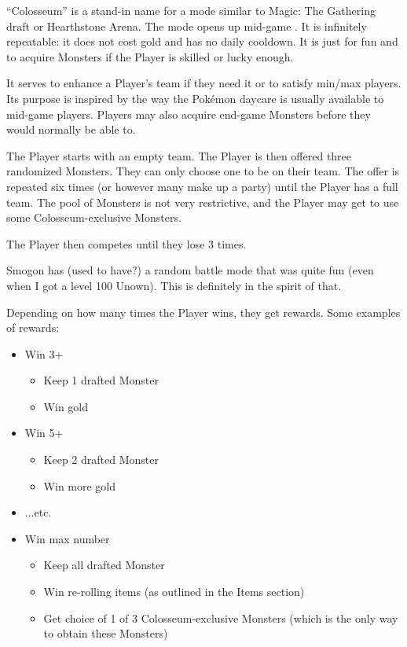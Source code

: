 ``Colosseum'' is a stand-in name for a mode similar to Magic: The Gathering draft or Hearthstone Arena. The mode opens up mid-game . It is infinitely repeatable: it does not cost gold and has no daily cooldown. It is just for fun and to acquire Monsters if the Player is skilled or lucky enough.

It serves to enhance a Player's team if they need it or to satisfy min/max players. Its purpose is inspired by the way the Pok\'{e}mon daycare is usually available to mid-game players. Players may also acquire end-game Monsters before they would normally be able to.

The Player starts with an empty team. The Player is then offered three randomized Monsters. They can only choose one to be on their team. The offer is repeated six times (or however many make up a party) until the Player has a full team. The pool of Monsters is not very restrictive, and the Player may get to use some Colosseum-exclusive Monsters.

The Player then competes until they lose 3  times.

Smogon has (used to have?) a random battle mode that was quite fun (even when I got a level 100 Unown). This is definitely in the spirit of that.

Depending on how many times the Player wins, they get rewards. Some examples of rewards:
\begin{itemize}
	\item{Win 3+
		\begin{itemize}
			\item{Keep 1 drafted Monster}
			\item{Win gold}
		\end{itemize}
	}
	\item{Win 5+
		\begin{itemize}
			\item{Keep 2 drafted Monster}
			\item{Win more gold}
		\end{itemize}
	}
	\item{...etc.}
	\item{Win max number 
		\begin{itemize}
			\item{Keep all drafted Monster}
			\item{Win re-rolling items (as outlined in the Items section)}
			\item{Get choice of 1 of 3 Colosseum-exclusive Monsters (which is the only way to obtain these Monsters)}
		\end{itemize}
	}
\end{itemize}

\postamble{}